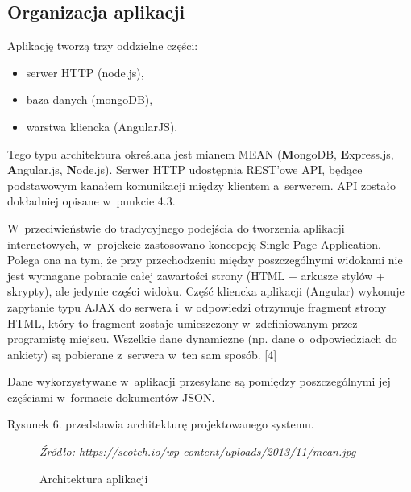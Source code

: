\documentclass[8pt,a4paper,notitlepage]{article}
\begin{document}
\subsection{Organizacja aplikacji}
Aplikację tworzą trzy oddzielne części:
\begin{itemize}
\item serwer HTTP (node.js),
\item baza danych (mongoDB),
\item warstwa kliencka (AngularJS).
\end{itemize}
Tego typu architektura określana jest mianem MEAN (\textbf{M}ongoDB, \textbf{E}xpress.js, \newline \textbf{A}ngular.js, \textbf{N}ode.js).
Serwer HTTP udostępnia REST'owe API, będące podstawowym kanałem komunikacji między klientem a~serwerem. API zostało dokładniej opisane w~punkcie 4.3.
\par W~przeciwieństwie do tradycyjnego podejścia do tworzenia aplikacji internetowych, w~projekcie zastosowano koncepcję Single Page Application. Polega ona na tym, że przy przechodzeniu między poszczególnymi widokami nie jest wymagane pobranie całej zawartości strony (HTML + arkusze stylów + skrypty), ale jedynie części widoku. Część kliencka aplikacji (Angular) wykonuje zapytanie typu AJAX do serwera i~w odpowiedzi otrzymuje fragment strony HTML, który to fragment zostaje umieszczony w~zdefiniowanym przez programistę miejscu. Wszelkie dane dynamiczne (np. dane o~odpowiedziach do ankiety) są pobierane z~serwera w~ten sam sposób. [4]
\par Dane wykorzystywane w~aplikacji przesyłane są pomiędzy poszczególnymi jej częściami w~formacie dokumentów JSON.
\par Rysunek 6. przedstawia architekturę projektowanego systemu.

\begin{figure}[H]
\begin{center}
\caption{Architektura aplikacji}
\end{center}
\textit{Źródło: https://scotch.io/wp-content/uploads/2013/11/mean.jpg}
\end{figure}
\end{document}
